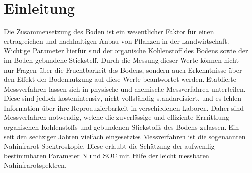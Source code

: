 \section{Einleitung}
\label{sec:Einleitung}

    Die Zusammensetzung des Boden ist ein wesentlicher Faktor für einen ertragreichen und nachhaltigen Anbau von Pflanzen in der Landwirtschaft.
    Wichtige Parameter hierfür sind der organische Kohlenstoff des Bodens sowie der im Boden gebundene Stickstoff. 
    Durch die Messung dieser Werte können nicht nur Fragen über die Fruchtbarkeit des Bodens, sondern auch Erkenntnisse über den Effekt der Bodennutzung auf diese Werte beantwortet werden.\cite{Poeplau2013}
    Etablierte Messverfahren lassen sich in physische und chemische Messverfahren unterteilen. 
    Diese sind jedoch kostenintensiv, nicht vollständig standardisiert, und es fehlen Information über ihre Reproduzierbarkeit in verschiedenen Laboren.\cite{Poeplau2013}
    Daher sind Messverfahren notwendig, welche die zuverlässige und effiziente Ermittlung organischen Kohlenstoffs und gebundenen Stickstoffs des Bodens zulassen.
    Ein seit den sechziger Jahren vielfach eingesetztes Messverfahren ist die sogenannten Nahinfrarot Spektroskopie. \cite{Agelet2010}
    Diese erlaubt die Schätzung der aufwendig bestimmbaren Parameter N und SOC mit Hilfe der leicht messbaren Nahinfrarotspektren.

	
